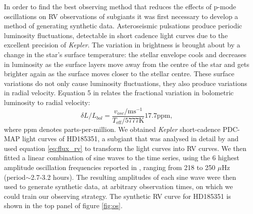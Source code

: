 \documentclass[useAMS, usenatbib]{aastex}
\begin{document}
In order to find the best observing method that reduces the effects of p-mode
oscillations on RV observations of subgiants it was first necessary to develop
a method of generating synthetic data.
Asteroseismic pulsations produce periodic luminosity fluctuations, detectable
in short cadence light curves due to the excellent precision of
{\it Kepler}.
The variation in brightness is brought about by a change in the star's surface
temperature: the stellar envelope cools and decreases in luminosity as the
surface layers move away from the centre of the star and gets brighter again
as the surface moves closer to the stellar centre.
These surface variations do not only cause luminosity fluctuations, they also
produce variations in radial velocity.
Equation 5 in \citet{Kjeldsen1995} relates the fractional variation in
bolometric luminosity to radial velocity:
\begin{equation}
	\delta L/L_{bol} = \frac{v_{osc}/\mathrm{ms}^{-1}}
	{T_{\mathrm{eff}}/5777\mathrm{K}}17.7\mathrm{ppm},
\end{equation}
\label{eq:flux_rv}
where ppm denotes parts-per-million.
We obtained {\it Kepler} short-cadence PDC-MAP light curves
\citep[][]{Smith2012, Stumpe2012} of HD185351, a subgiant that was analysed in
detail by \citet{Johnson2014} and used equation \ref{eq:flux_rv} to transform
the light curves into RV curves.
We then fitted a linear combination of sine waves to the time series, using
the 6 highest amplitude oscillation frequencies reported in
\citet{Johnson2014}, ranging from 218 to 250 $\mu$Hz (period$\sim$2.7-3.2
hours).
The resulting amplitudes of each sine wave were then used to generate
synthetic data, at arbitrary observation times, on which we could train our
observing strategy.
The synthetic RV curve for HD185351 is shown in the top panel of figure
\ref{fig:os}.
\end{document}
